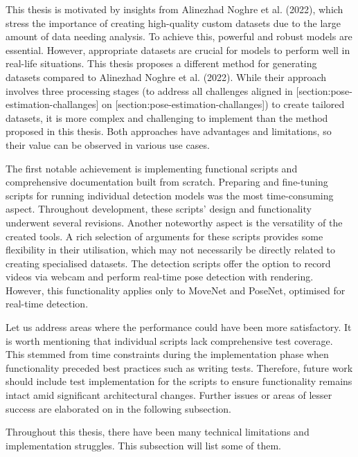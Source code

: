 This thesis is motivated by insights from \scl Alinezhad Noghre et al. (2022), which stress the importance of creating high-quality custom datasets due to the large amount of data needing analysis. To achieve this, powerful and robust models are essential. However, appropriate datasets are crucial for models to perform well in real-life situations. This thesis proposes a different method for generating datasets compared to \scl Alinezhad Noghre et al. (2022). While their approach involves three processing stages (to address all challenges aligned in [section:pose-estimation-challanges] on [section:pose-estimation-challanges]) to create tailored datasets, it is more complex and challenging to implement than the method proposed in this thesis. Both approaches have advantages and limitations, so their value can be observed in various use cases.

The first notable achievement is implementing functional scripts and comprehensive documentation built from scratch. Preparing and fine-tuning scripts for running individual detection models was the most time-consuming aspect. Throughout development, these scripts' design and functionality underwent several revisions. Another noteworthy aspect is the versatility of the created tools. A rich selection of arguments for these scripts provides some flexibility in their utilisation, which may not necessarily be directly related to creating specialised datasets. The detection scripts offer the option to record videos via webcam and perform real-time pose detection with rendering. However, this functionality applies only to MoveNet and PoseNet, optimised for real-time detection.

Let us address areas where the performance could have been more satisfactory. It is worth mentioning that individual scripts lack comprehensive test coverage. This stemmed from time constraints during the implementation phase when functionality preceded best practices such as writing tests. Therefore, future work should include test implementation for the scripts to ensure functionality remains intact amid significant architectural changes. Further issues or areas of lesser success are elaborated on in the following subsection.

Throughout this thesis, there have been many technical limitations and im\-plementation struggles. This subsection will list some of them.

